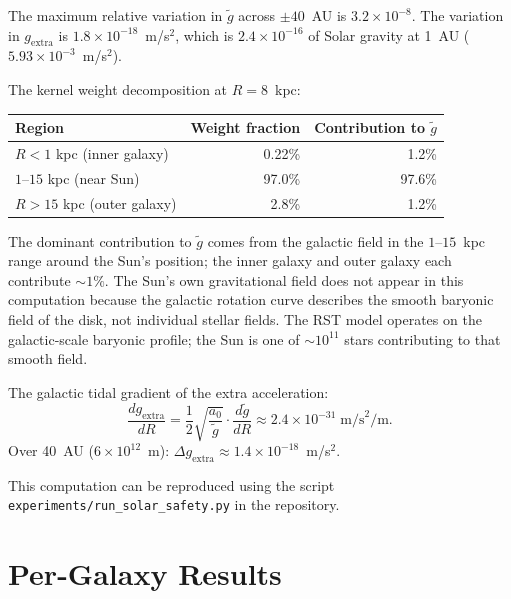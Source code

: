 \documentclass[11pt,a4paper]{article}
\begin{document}
The maximum relative variation in $\tilde{g}$ across $\pm 40$~AU is $3.2 \times 10^{-8}$.
The variation in $g_{\mathrm{extra}}$ is $1.8 \times 10^{-18}$~m/s$^2$, which is $2.4 \times 10^{-16}$ of Solar gravity at 1~AU ($5.93 \times 10^{-3}$~m/s$^2$).

The kernel weight decomposition at $R = 8$~kpc:
\begin{center}
\begin{tabular}{lrr}
\toprule
\textbf{Region} & \textbf{Weight fraction} & \textbf{Contribution to $\tilde{g}$} \\
\midrule
$R < 1$ kpc (inner galaxy) & 0.22\% & 1.2\% \\
$1$--$15$ kpc (near Sun) & 97.0\% & 97.6\% \\
$R > 15$ kpc (outer galaxy) & 2.8\% & 1.2\% \\
\bottomrule
\end{tabular}
\end{center}

The dominant contribution to $\tilde{g}$ comes from the galactic field in the $1$--$15$~kpc range around the Sun's position; the inner galaxy and outer galaxy each contribute ${\sim}1\%$.
The Sun's own gravitational field does not appear in this computation because the galactic rotation curve describes the smooth baryonic field of the disk, not individual stellar fields.
The RST model operates on the galactic-scale baryonic profile; the Sun is one of ${\sim}10^{11}$ stars contributing to that smooth field.

The galactic tidal gradient of the extra acceleration:
\begin{equation}
\frac{dg_{\mathrm{extra}}}{dR} = \frac{1}{2}\sqrt{\frac{a_0}{\tilde{g}}} \cdot \frac{d\tilde{g}}{dR} \approx 2.4 \times 10^{-31} \;\text{m/s}^2\text{/m}.
\end{equation}
Over 40~AU ($6 \times 10^{12}$~m): $\Delta g_{\mathrm{extra}} \approx 1.4 \times 10^{-18}$~m/s$^2$.

This computation can be reproduced using the script \texttt{experiments/run\_solar\_safety.py} in the repository.

\section{Per-Galaxy Results}
\label{app:galaxies}
\end{document}
